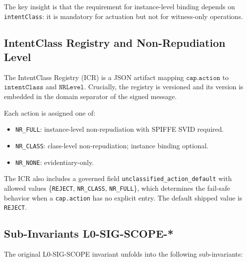 \documentclass[11pt]{article}
\begin{document}
The key insight is that the requirement for instance-level binding
depends on \texttt{intentClass}: it is mandatory for actuation but
not for witness-only operations.

\subsection{IntentClass Registry and Non-Repudiation Level}

The IntentClass Registry (ICR) is a JSON artifact mapping
\(\texttt{cap.action}\) to \(\texttt{intentClass}\) and \(\texttt{NRLevel}\).
Crucially, the registry is versioned and its version is embedded in
the domain separator of the signed message.

Each action is assigned one of:
\begin{itemize}
  \item \texttt{NR\_FULL}: instance-level non-repudiation with
        SPIFFE SVID required.
  \item \texttt{NR\_CLASS}: class-level non-repudiation; instance
        binding optional.
  \item \texttt{NR\_NONE}: evidentiary-only.
\end{itemize}

The ICR also includes a governed field
\texttt{unclassified\_action\_default} with allowed values
\{\texttt{REJECT}, \texttt{NR\_CLASS}, \texttt{NR\_FULL}\},
which determines the fail-safe behavior when a \texttt{cap.action}
has no explicit entry. The default shipped value is \texttt{REJECT}.

\subsection{Sub-Invariants L0-SIG-SCOPE-*}

The original L0-SIG-SCOPE invariant unfolds into the following
sub-invariants:
\end{document}
